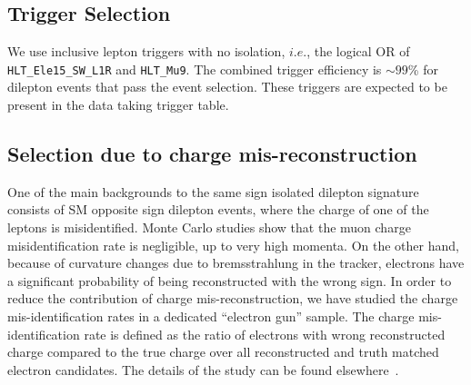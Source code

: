 \subsection{Trigger Selection}
\label{sec:trigger}
We use inclusive lepton triggers with no isolation, $i.e.$, the logical OR of {\tt HLT\_Ele15\_SW\_L1R} and {\tt HLT\_Mu9}.  
The combined trigger efficiency is $\sim 99$\% for dilepton events that pass the event selection.
These triggers are 
expected to be present in the data taking trigger table.

\subsection{Selection due to charge mis-reconstruction}
\label{sec:gsfctf}
One of the main backgrounds to the same sign isolated dilepton signature consists of 
SM opposite sign dilepton events, where the charge of one of the leptons is misidentified.
Monte Carlo studies show that the muon charge misidentification rate is negligible, up to very 
high momenta.  On the other hand, because of curvature changes due to bremsstrahlung in the tracker, electrons have a 
significant probability of being reconstructed with the wrong sign. 
In order to reduce the contribution of charge mis-reconstruction, we have studied the 
charge mis-identification rates in a dedicated ``electron gun'' sample. The charge 
mis-identification rate is defined as the ratio of electrons with wrong reconstructed
charge compared to the true charge over all reconstructed and truth matched electron
candidates. The details of the study can be found elsewhere~\cite{ctfgsf}.  
\vspace{3 mm}
